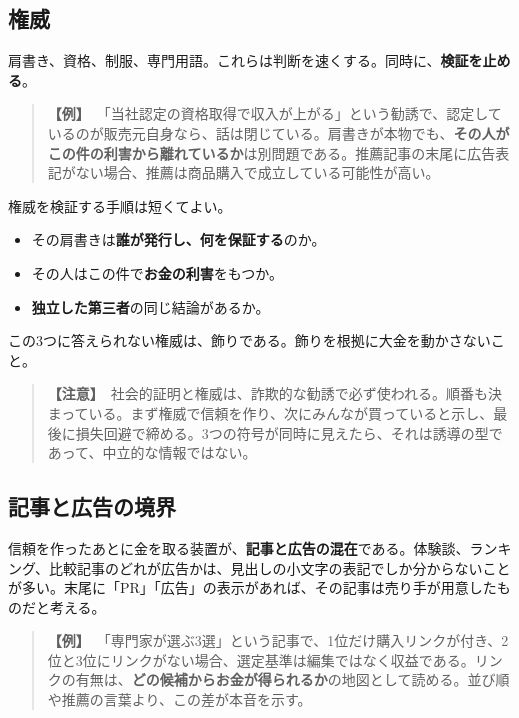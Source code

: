 \documentclass{article}
\begin{document}
\subsection{権威}

肩書き、資格、制服、専門用語。これらは判断を速くする。同時に、\textbf{検証を止める}。

\begin{quote}
\textbf{【例】}\ 「当社認定の資格取得で収入が上がる」という勧誘で、認定しているのが販売元自身なら、話は閉じている。肩書きが本物でも、\textbf{その人がこの件の利害から離れているか}は別問題である。推薦記事の末尾に広告表記がない場合、推薦は商品購入で成立している可能性が高い。
\end{quote}

権威を検証する手順は短くてよい。

\begin{itemize}
\item その肩書きは\textbf{誰が発行し、何を保証する}のか。
\item その人はこの件で\textbf{お金の利害}をもつか。
\item \textbf{独立した第三者}の同じ結論があるか。
\end{itemize}

この3つに答えられない権威は、飾りである。飾りを根拠に大金を動かさないこと。

\begin{quote}
\textbf{【注意】}\ 社会的証明と権威は、詐欺的な勧誘で必ず使われる。順番も決まっている。まず権威で信頼を作り、次にみんなが買っていると示し、最後に損失回避で締める。3つの符号が同時に見えたら、それは誘導の型であって、中立的な情報ではない。
\end{quote}

\subsection{記事と広告の境界}

信頼を作ったあとに金を取る装置が、\textbf{記事と広告の混在}である。体験談、ランキング、比較記事のどれが広告かは、見出しの小文字の表記でしか分からないことが多い。末尾に「PR」「広告」の表示があれば、その記事は売り手が用意したものだと考える。

\begin{quote}
\textbf{【例】}\ 「専門家が選ぶ3選」という記事で、1位だけ購入リンクが付き、2位と3位にリンクがない場合、選定基準は編集ではなく収益である。リンクの有無は、\textbf{どの候補からお金が得られるか}の地図として読める。並び順や推薦の言葉より、この差が本音を示す。
\end{quote}
\end{document}
